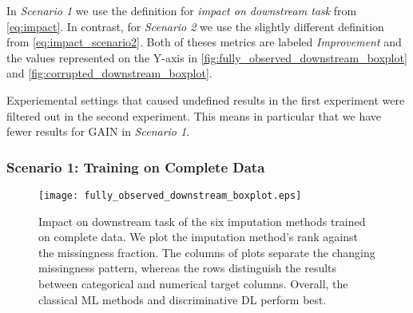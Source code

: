 In \textit{Scenario 1} we use the definition for \textit{impact on downstream task} from \autoref{eq:impact}. In contrast, for \textit{Scenario 2} we use the slightly different definition from \autoref{eq:impact_scenario2}. Both of theses metrics are labeled \textit{Improvement} and the values represented on the Y-axis in \autoref{fig:fully_observed_downstream_boxplot} and \autoref{fig:corrupted_downstream_boxplot}.

Experiemental settings that caused undefined results in the first experiment were filtered out in the second experiment. This means in particular that we have fewer results for GAIN in \textit{Scenario 1}.




\subsubsection{Scenario 1: Training on Complete Data}



\begin{figure}\centering
	\texttt{[image: fully\_observed\_downstream\_boxplot.eps]}

	\caption[Downstream Ranks - Fully Observed]{Impact on downstream task of the six imputation methods trained on complete data. We plot the imputation method's rank against the missingness fraction. The columns of plots separate the changing missingness pattern, whereas the rows distinguish the results between categorical and numerical target columns. Overall, the classical ML methods and discriminative DL perform best.
    }
	\label{fig:fully_observed_downstream_boxplot}
\end{figure}

